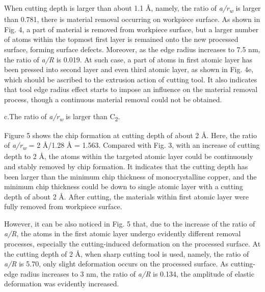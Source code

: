 \documentclass{article}
\begin{document}
When cutting depth is larger than about 1.1 Å, namely, the ratio of \emph{a/r}\textsubscript{\emph{w}} is larger than 0.781, there is material removal occurring on workpiece surface. As shown in Fig. 4, a part of material is removed from workpiece surface, but a larger number of atoms within the topmost first layer is remained onto the new processed surface, forming surface defects. Moreover, as the edge radius increases to 7.5 nm, the ratio of \emph{a/R} is 0.019. At such case, a part of atoms in first atomic layer has been pressed into second layer and even third atomic layer, as shown in Fig. 4e, which should be ascribed to the extrusion action of cutting tool. It also indicates that tool edge radius effect starts to impose an influence on the material removal process, though a continuous material removal could not be obtained.

\begin{hangpars}
c.\quad The ratio of \emph{a/r}\textsubscript{\emph{w}} is larger than C\textsubscript{2}.
\end{hangpars}

Figure 5 shows the chip formation at cutting depth of about 2 Å. Here, the ratio of \emph{a/r}\textsubscript{\emph{w}} = 2 Å/1.28 Å = 1.563. Compared with Fig. 3, with an increase of cutting depth to 2 Å, the atoms within the targeted atomic layer could be continuously and stably removed by chip formation. It indicates that the cutting depth has been larger than the minimum chip thickness of monocrystalline copper, and the minimum chip thickness could be down to single atomic layer with a cutting depth of about 2 Å. After cutting, the materials within first atomic layer were fully removed from workpiece surface.

However, it can be also noticed in Fig. 5 that, due to the increase of the ratio of \emph{a/R}, the atoms in the first atomic layer undergo evidently different removal processes, especially the cutting-induced deformation on the processed surface. At the cutting depth of 2 Å, when sharp cutting tool is used, namely, the ratio of \emph{a/R} is 5.70, only slight deformation occurs on the processed surface. As cutting-edge radius increases to 3 nm, the ratio of \emph{a/R} is 0.134, the amplitude of elastic deformation was evidently increased.
\end{document}
